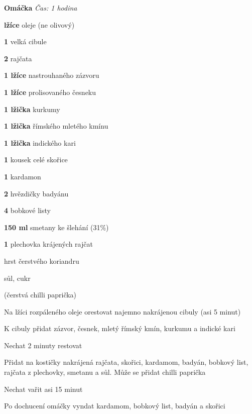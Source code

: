 \textbf{Omáčka}
\emph{Čas: 1 hodina}
\begin{ingredience}
  \item \textbf{lžíce} oleje (ne olivový)
  \item \textbf{1} velká cibule
  \item \textbf{2} rajčata
  \item \textbf{1 lžíce} nastrouhaného zázvoru
  \item \textbf{1 lžíce} prolisovaného česneku
  \item \textbf{1 lžička} kurkumy
  \item \textbf{1 lžička} římského mletého kmínu
  \item \textbf{1 lžička} indického kari
  \item \textbf{1} kousek celé skořice
  \item \textbf{1} kardamon
  \item \textbf{2} hvězdičky badyánu
  \item \textbf{4} bobkové listy
  \item \textbf{150 ml} smetany ke šlehání (31\%)
  \item \textbf{1} plechovka krájených rajčat
  \item hrst čerstvého koriandru
  \item sůl, cukr
  \item (čerstvá chilli paprička)
\end{ingredience}
\begin{postup}
  \item Na lžíci rozpáleného oleje orestovat najemno nakrájenou cibuly (asi 5 minut)
  \item K cibuly přidat zázvor, česnek, mletý římský kmín, kurkumu a indické kari
  \item Nechat 2 minuty restovat
  \item Přidat na kostičky nakrájená rajčata, skořici, kardamom, badyán, bobkový list, rajčata z plechovky, smetanu a sůl. Může se přidat chilli paprička
  \item Nechat vařit asi 15 minut
  \item Po dochucení omáčky vyndat kardamom, bobkový list, badyán a skořici
\end{postup}


